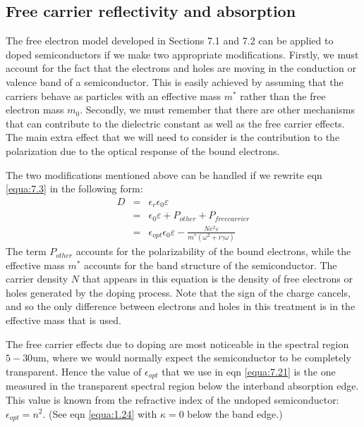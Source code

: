 \documentclass[12pt]{book}
\def\um{\mathrm{um}}
\begin{document}
{\subsection{Free carrier reflectivity and absorption}

The free electron model developed in Sections 7.1 and 7.2 can be applied to doped semiconductors if we make two appropriate modifications. Firstly, we must account for the fact that the electrons and holes are moving in the conduction or valence band of a semiconductor. This is easily achieved by assuming that the carriers behave as particles with an effective mass $m^*$ rather than the free electron mass $m_0$. Secondly, we must remember that there are other mechanisms that can contribute to the dielectric constant as well as the free carrier effects. The main extra effect that we will need to consider is the contribution to the polarization due to the optical response of the bound electrons.

The two modifications mentioned above can be handled if we rewrite eqn \ref{equa:7.3} in the following form:
\begin{eqnarray}
\nonumber  D &=& \epsilon_r\epsilon_0\varepsilon  \\
\nonumber   &=& \epsilon_0\varepsilon+P_{other}+P_{free carrier} \\
   &=& \epsilon_{opt}\epsilon_0\varepsilon-\frac{Ne^2\varepsilon}{m^*(\omega^2+i\gamma\omega)} \label{equa:7.21}
\end{eqnarray}
The term $P_{other}$ accounts for the polarizability of the bound electrons, while the effective mass $m^*$ accounts for the band structure of the semiconductor. The carrier density $N$ that appears in this equation is the density of free electrons or holes generated by the doping process. Note that the sign of the charge cancels, and so the only difference between electrons and holes in this treatment is in the effective mass that is used.

The free carrier effects due to doping are most noticeable in the spectral region $5-30\um$, where we would normally expect the semiconductor to be completely transparent. Hence the value of $\epsilon_{opt}$ that we use in eqn \ref{equa:7.21} is the one measured in the transparent spectral region below the interband absorption edge. This value is known from the refractive index of the undoped semiconductor: $\epsilon_{opt} = n^2$. (See eqn \ref{equa:1.24} with $\kappa = 0$ below the band edge.)

}
\end{document}
